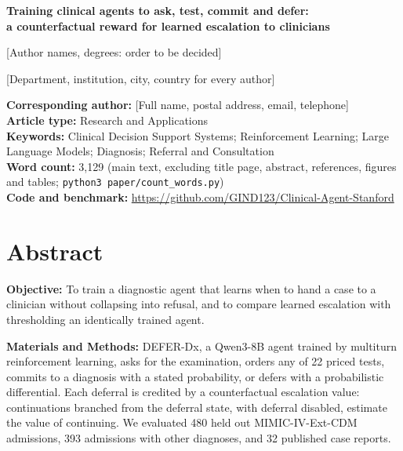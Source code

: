 \documentclass[11pt]{article}
\begin{document}
\RaggedRight
\setlength{\parindent}{1.5em}

\begin{titlepage}
\begin{center}
{\LARGE\bfseries Training clinical agents to ask, test, commit and defer:\\[4pt] a counterfactual reward for learned escalation to clinicians\par}
\vspace{1.2em}
{\large [Author names, degrees: order to be decided]\par}
\vspace{0.6em}
{[Department, institution, city, country for every author]\par}
\end{center}
\vspace{1.5em}
\noindent\textbf{Corresponding author:} [Full name, postal address, email, telephone]\\[6pt]
\textbf{Article type:} Research and Applications\\[6pt]
\textbf{Keywords:} Clinical Decision Support Systems; Reinforcement Learning; Large Language Models; Diagnosis; Referral and Consultation\\[6pt]
\textbf{Word count:} 3,129 (main text, excluding title page, abstract, references, figures and tables; \texttt{python3 paper/count\_words.py})\\[6pt]
\textbf{Code and benchmark:} \url{https://github.com/GIND123/Clinical-Agent-Stanford}
\end{titlepage}

\section*{Abstract}
\noindent\textbf{Objective:} To train a diagnostic agent that learns when to hand a case to a clinician without collapsing into refusal, and to compare learned escalation with thresholding an identically trained agent.

\noindent\textbf{Materials and Methods:} DEFER-Dx, a Qwen3-8B agent trained by multiturn reinforcement learning, asks for the examination, orders any of 22 priced tests, commits to a diagnosis with a stated probability, or defers with a probabilistic differential. Each deferral is credited by a counterfactual escalation value: continuations branched from the deferral state, with deferral disabled, estimate the value of continuing. We evaluated 480 held out MIMIC-IV-Ext-CDM admissions, 393 admissions with other diagnoses, and 32 published case reports.
\end{document}
